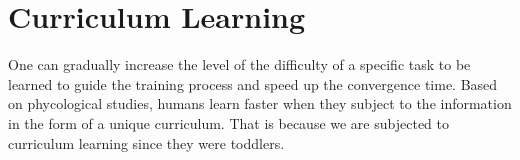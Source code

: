 
\section{Curriculum Learning}


One can gradually increase the level of the difficulty of a specific task to be learned to guide the training process and speed up the convergence time. Based on phycological studies, humans learn faster when they subject to the information in the form of a unique curriculum. That is because we are subjected to curriculum learning since they were toddlers. 

